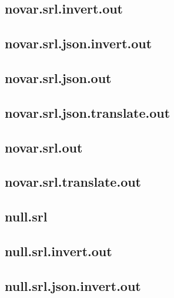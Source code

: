 \subsection{novar.srl.invert.out}
\label{app:novar_srl.invert.out}

\subsection{novar.srl.json.invert.out}
\label{app:novar_srl.json.invert.out}

\subsection{novar.srl.json.out}
\label{app:novar_srl.json.out}

\subsection{novar.srl.json.translate.out}
\label{app:novar_srl.json.translate.out}

\subsection{novar.srl.out}
\label{app:novar_srl.out}

\subsection{novar.srl.translate.out}
\label{app:novar_srl.translate.out}

\subsection{null.srl}
\label{app:null_srl}

\subsection{null.srl.invert.out}
\label{app:null_srl.invert.out}

\subsection{null.srl.json.invert.out}
\label{app:null_srl.json.invert.out}

